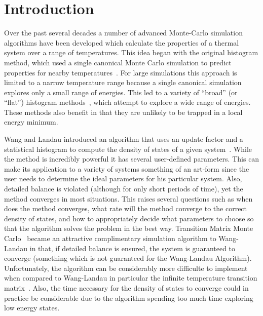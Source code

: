 \documentclass[letterpaper,twocolumn,amsmath,amssymb,pre,aps,10pt]{revtex4-1}
\begin{document}
\section{Introduction}
Over the past several decades a number of advanced Monte-Carlo
simulation algorithms have been developed which calculate the
properties of a thermal system over a range of temperatures.  This
idea began with the original histogram method, which used a single
canonical Monte Carlo simulation to predict properties for nearby
temperatures~\cite{ferrenberg1988new}.  For large simulations this
approach is limited to a narrow temperature range because a single
canonical simulation explores only a small range of energies.  This
led to a variety of ``broad'' (or ``flat'') histogram
methods~\cite{penna1996broad, penna1998broad, swendsen1999transition,
  wang2001determining, wang2001efficient, trebst2004optimizing}, which
attempt to explore a wide range of energies.  These methods also
benefit in that they are unlikely to be trapped in a local energy
minimum.

Wang and Landau introduced an algorithm that uses an update
factor and a statistical histogram to compute the density of states of
a given system~\cite{wang2001determining, wang2001efficient}.  While
the method is incredibly powerful it has several user-defined
parameters.  This can make its application to a variety of systems
something of an art-form since the user needs to determine the ideal
parameters for his particular system.  Also, detailed balance is
violated (although for only short periods of time), yet the method
converges in most situations.  This raises several questions such as
when does the method converges, what rate will the method converge to
the correct density of states, and how to appropriately decide what
parameters to choose so that the algorithm solves the problem in the
best way. Transition Matrix Monte Carlo~\cite{wang1999transition,
swendsen1999transition, fitzgerald2000monte} became an attractive
complimentary simulation algorithm to Wang-Landau in that, if detailed
balance is ensured, the system is guaranteed to converge (something
which is not guaranteed for the Wang-Landau Algorithm).  Unfortunately,
the algorithm can be considerably more difficulte to implement when
compared to Wang-Landau in particular the infinite temperature
transition matrix~\cite{wang2002transition}.  Also, the time necessary
for the density of states to converge could in practice be considerable
due to the algorithm spending too much time exploring low energy states.
\end{document}
